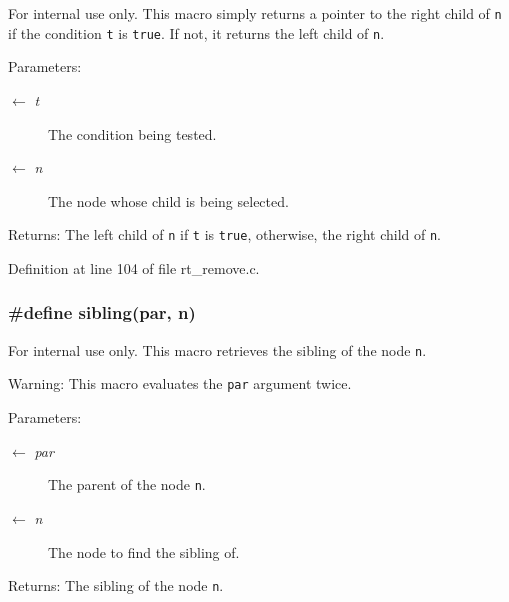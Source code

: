 \begin{Desc}
\item[For internal use only.]
This macro simply returns a pointer to the right child of {\tt n} if the condition {\tt t} is {\tt true}. If not, it returns the left child of {\tt n}.

\begin{Desc}
\item[Parameters:]
\begin{description}
\item[\mbox{$\leftarrow$} {\em t}]The condition being tested. \item[\mbox{$\leftarrow$} {\em n}]The node whose child is being selected.\end{description}
\end{Desc}
\begin{Desc}
\item[Returns:]The left child of {\tt n} if {\tt t} is {\tt true}, otherwise, the right child of {\tt n}.\end{Desc}
\end{Desc}


Definition at line 104 of file rt\_\-remove.c.\hypertarget{group__dbprim__rbtree_ga49}{
\subsubsection[sibling]{\setlength{\rightskip}{0pt plus 5cm}\#define sibling(par, n)}}
\label{group__dbprim__rbtree_ga49}


\begin{Desc}
\item[For internal use only.]
This macro retrieves the sibling of the node {\tt n}.

\begin{Desc}
\item[Warning:]This macro evaluates the {\tt par} argument twice.\end{Desc}
\begin{Desc}
\item[Parameters:]
\begin{description}
\item[\mbox{$\leftarrow$} {\em par}]The parent of the node {\tt n}. \item[\mbox{$\leftarrow$} {\em n}]The node to find the sibling of.\end{description}
\end{Desc}
\begin{Desc}
\item[Returns:]The sibling of the node {\tt n}.\end{Desc}
\end{Desc}


